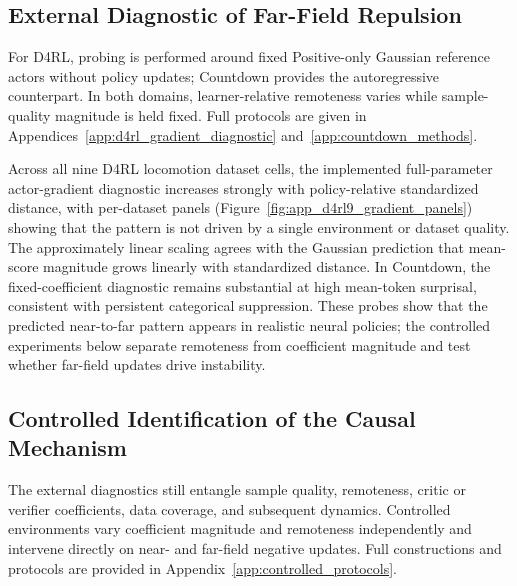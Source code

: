\documentclass[sigconf,anonymous,review]{acmart}
\theoremstyle{acmdefinition}
\begin{document}
\subsection{External Diagnostic of Far-Field Repulsion}
\label{sec:external_far_field}

For D4RL, probing is performed around fixed Positive-only Gaussian reference
actors without policy updates; Countdown provides the autoregressive
counterpart. In both domains, learner-relative remoteness varies while
sample-quality magnitude is held fixed. Full protocols are given in
Appendices~\ref{app:d4rl_gradient_diagnostic}
and~\ref{app:countdown_methods}.

Across all nine D4RL locomotion dataset cells, the implemented
full-parameter actor-gradient diagnostic increases strongly with
policy-relative standardized distance, with per-dataset panels
(Figure~\ref{fig:app_d4rl9_gradient_panels}) showing that the pattern is not
driven by a single environment or dataset quality. The approximately linear
scaling agrees with the Gaussian prediction that mean-score magnitude grows
linearly with standardized distance. In Countdown, the fixed-coefficient
diagnostic remains substantial at high mean-token surprisal, consistent with
persistent categorical suppression. These probes show that the predicted
near-to-far pattern appears in realistic neural policies; the controlled
experiments below separate remoteness from coefficient magnitude and test
whether far-field updates drive instability.




\subsection{Controlled Identification of the Causal Mechanism}
\label{sec:controlled_identification}

The external diagnostics still entangle sample quality, remoteness, critic or
verifier coefficients, data coverage, and subsequent dynamics. Controlled
environments vary coefficient magnitude and remoteness independently and
intervene directly on near- and far-field negative updates. Full constructions
and protocols are provided in
Appendix~\ref{app:controlled_protocols}.
\end{document}
